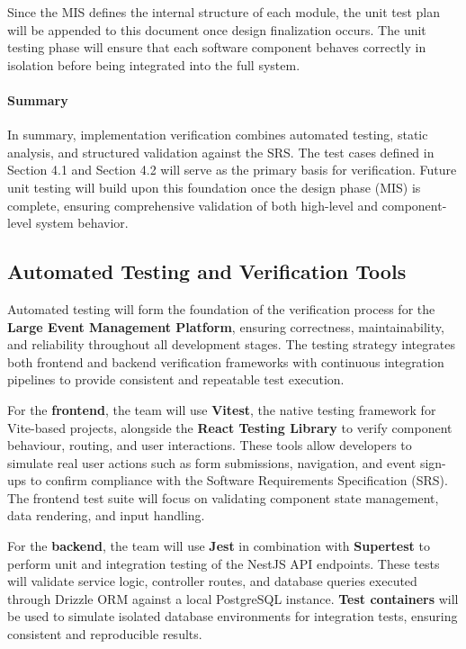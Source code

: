 \documentclass[12pt, titlepage]{article}
\begin{document}
\noindent Since the MIS defines the internal structure of each module, the unit test plan will be appended to this document once design finalization occurs. The unit testing phase will ensure that each software component behaves correctly in isolation before being integrated into the full system.

\paragraph{Summary}
\noindent \newline
In summary, implementation verification combines automated testing, static analysis, and structured validation against the SRS. The test cases defined in Section 4.1 and Section 4.2 will serve as the primary basis for verification. Future unit testing will build upon this foundation once the design phase (MIS) is complete, ensuring comprehensive validation of both high-level and component-level system behavior.


\subsection{Automated Testing and Verification Tools}

Automated testing will form the foundation of the verification process for the \textbf{Large Event Management Platform}, ensuring correctness, maintainability, and reliability throughout all development stages. The testing strategy integrates both frontend and backend verification frameworks with continuous integration pipelines to provide consistent and repeatable test execution.

For the \textbf{frontend}, the team will use \textbf{Vitest}, the native testing framework for Vite-based projects, alongside the \textbf{React Testing Library} to verify component behaviour, routing, and user interactions. These tools allow developers to simulate real user actions such as form submissions, navigation, and event sign-ups to confirm compliance with the Software Requirements Specification (SRS). The frontend test suite will focus on validating component state management, data rendering, and input handling.

For the \textbf{backend}, the team will use \textbf{Jest} in combination with \textbf{Supertest} to perform unit and integration testing of the NestJS API endpoints. These tests will validate service logic, controller routes, and database queries executed through Drizzle ORM against a local PostgreSQL instance. \textbf{Test containers} will be used to simulate isolated database environments for integration tests, ensuring consistent and reproducible results.
\end{document}
